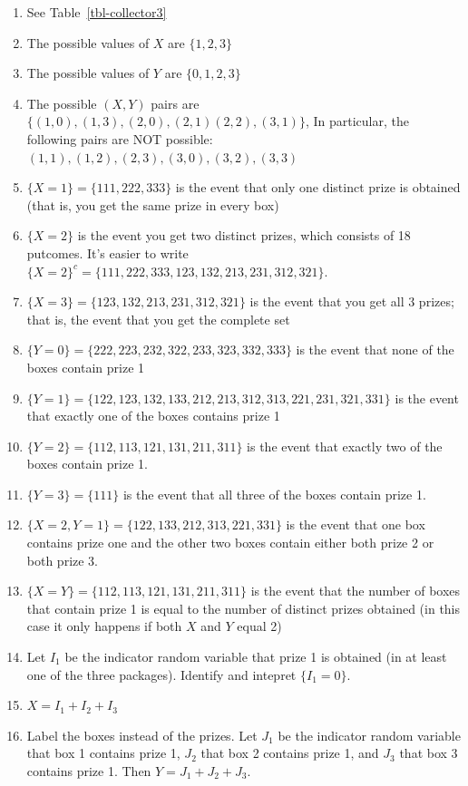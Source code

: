 \documentclass[
  letterpaper,
  DIV=11,
  numbers=noendperiod]{scrreprt}
\providecommand{\tightlist}{%
  \setlength{\itemsep}{0pt}\setlength{\parskip}{0pt}}
\theoremstyle{plain}
\theoremstyle{definition}
\theoremstyle{definition}
\theoremstyle{definition}
\theoremstyle{remark}
\begin{document}
\begin{enumerate}
\def\labelenumi{\arabic{enumi}.}
\tightlist
\item
  See Table~\ref{tbl-collector3}
\item
  The possible values of \(X\) are \(\{1, 2, 3\}\)
\item
  The possible values of \(Y\) are \(\{0, 1, 2, 3\}\)
\item
  The possible \((X, Y)\) pairs are
  \(\{(1, 0), (1, 3), (2, 0), (2, 1) (2, 2), (3, 1)\}\), In particular,
  the following pairs are NOT possible:
  \((1, 1), (1, 2), (2, 3), (3, 0), (3, 2), (3, 3)\)
\item
  \(\{X = 1\} = \{111, 222, 333\}\) is the event that only one distinct
  prize is obtained (that is, you get the same prize in every box)
\item
  \(\{X=2\}\) is the event you get two distinct prizes, which consists
  of 18 putcomes. It's easier to write
  \(\{X = 2\}^c = \{111, 222, 333, 123, 132, 213, 231, 312, 321\}\).
\item
  \(\{X = 3\} = \{123, 132, 213, 231, 312, 321\}\) is the event that you
  get all 3 prizes; that is, the event that you get the complete set
\item
  \(\{Y = 0\}=\{222, 223, 232, 322, 233, 323, 332, 333\}\) is the event
  that none of the boxes contain prize 1
\item
  \(\{Y = 1\}=\{122, 123, 132, 133, 212, 213, 312, 313, 221, 231, 321, 331\}\)
  is the event that exactly one of the boxes contains prize 1
\item
  \(\{Y = 2\}=\{112, 113, 121, 131, 211, 311\}\) is the event that
  exactly two of the boxes contain prize 1.
\item
  \(\{Y = 3\}=\{111\}\) is the event that all three of the boxes contain
  prize 1.
\item
  \(\{X = 2, Y = 1\} = \{122, 133, 212, 313, 221, 331\}\) is the event
  that one box contains prize one and the other two boxes contain either
  both prize 2 or both prize 3.
\item
  \(\{X = Y\} = \{112, 113, 121, 131, 211, 311\}\) is the event that the
  number of boxes that contain prize 1 is equal to the number of
  distinct prizes obtained (in this case it only happens if both \(X\)
  and \(Y\) equal 2)
\item
  Let \(I_1\) be the indicator random variable that prize 1 is obtained
  (in at least one of the three packages). Identify and intepret
  \(\{I_1 = 0\}\).
\item
  \(X = I_1+ I_2+ I_3\)
\item
  Label the boxes instead of the prizes. Let \(J_1\) be the indicator
  random variable that box 1 contains prize 1, \(J_2\) that box 2
  contains prize 1, and \(J_3\) that box 3 contains prize 1. Then
  \(Y = J_1+ J_2+ J_3\).
\end{enumerate}
\end{document}
